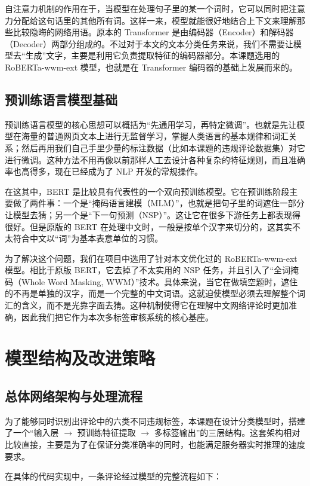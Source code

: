 \documentclass[twoside]{thesis-cls-Miya} %
\begin{document}
自注意力机制的作用在于，当模型在处理句子里的某一个词时，它可以同时把注意力分配给这句话里的其他所有词。这样一来，模型就能很好地结合上下文来理解那些比较隐晦的网络用语。原本的 Transformer 是由编码器（Encoder）和解码器（Decoder）两部分组成的。不过对于本文的文本分类任务来说，我们不需要让模型去“生成”文字，主要是利用它负责提取特征的编码器部分。本课题选用的 RoBERTa-wwm-ext 模型，也就是在 Transformer 编码器的基础上发展而来的。

\section{预训练语言模型基础}
预训练语言模型的核心思想可以概括为“先通用学习，再特定微调”。也就是先让模型在海量的普通网页文本上进行无监督学习，掌握人类语言的基本规律和词汇关系；然后再用我们自己手里少量的标注数据（比如本课题的违规评论数据集）对它进行微调。这种方法不用再像以前那样人工去设计各种复杂的特征规则，而且准确率也高得多，现在已经成为了 NLP 开发的常规操作。

在这其中，BERT 是比较具有代表性的一个双向预训练模型。它在预训练阶段主要做了两件事：一个是“掩码语言建模（MLM）”，也就是把句子里的词遮住一部分让模型去猜；另一个是“下一句预测（NSP）”。这让它在很多下游任务上都表现得很好。但是原版的 BERT 在处理中文时，一般是按单个汉字来切分的，这其实不太符合中文以“词”为基本表意单位的习惯。

为了解决这个问题，我们在项目中选用了针对本文优化过的 RoBERTa-wwm-ext 模型。相比于原版 BERT，它去掉了不太实用的 NSP 任务，并且引入了“全词掩码（Whole Word Masking, WWM）”技术。具体来说，当它在做填空题时，遮住的不再是单独的汉字，而是一个完整的中文词语。这就迫使模型必须去理解整个词汇的含义，而不是光靠字面去猜。这种机制使得它在理解中文网络评论时更加准确，因此我们把它作为本次多标签审核系统的核心基座。


\chapter{模型结构及改进策略}

\section{总体网络架构与处理流程}
为了能够同时识别出评论中的六类不同违规标签，本课题在设计分类模型时，搭建了一个“输入层 $\rightarrow$ 预训练特征提取 $\rightarrow$ 多标签输出”的三层结构。这套架构相对比较直接，主要是为了在保证分类准确率的同时，也能满足服务器实时推理的速度要求。

在具体的代码实现中，一条评论经过模型的完整流程如下：
\end{document}

